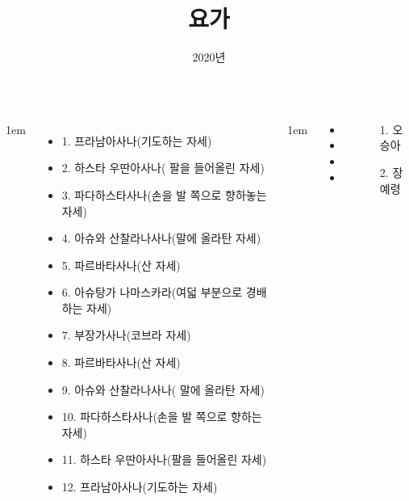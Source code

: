 \documentclass[25pt, a1paper ]{tikzposter}
\title{ 요가 }
\author{2020년 }
\begin{document}
	\maketitle

	\begin{columns}


			{
					\setlength{\leftmargini}{2em}
					\setlength{\labelsep} {1em}
					\begin{itemize}
					\item 1. 프라남아사나(기도하는 자세) 
					\item 2. 하스타 우딴아사나( 팔을 들어올린 자세)
					\item 3. 파다하스타사나(손을 발 쪽으로 향하놓는 자세)
					\item 4. 아슈와 산찰라나사나(말에 올라탄 자세)
					\item 5. 파르바타사나(산 자세)
					\item 6. 아슈탕가 나마스카라(여덟 부분으로 경배하는 자세)
					\item 7. 부장가사나(코브라 자세)
					\item 8. 파르바타사나(산 자세)
					\item 9. 아슈와 산찰라나사나( 말에 올라탄 자세)
					\item 10. 파다하스타사나(손을 발 쪽으로 향하는 자세)
					\item 11. 하스타 우딴아사나(팔을 들어올린 자세)
					\item 12. 프라남아사나(기도하는 자세)
					\end{itemize}
			}

			{
					\setlength{\leftmargini}{3em}
					\setlength{\labelsep} {1em}
				\begin{LARGE}
					\begin{itemize}
					\item 
					\item 
					\item 
					\item 
					\end{itemize}
				\end{LARGE}
			}



		{
			\setlength{\leftmargini}{3em}			
			\setlength{\labelsep}{1em} %
			\begin{LARGE}
			\begin{itemize}
			\item [1.] 오승아 
			\item [2.] 장예령
			\end{itemize}
			\end{LARGE}

}
\end{columns}
\end{document}
